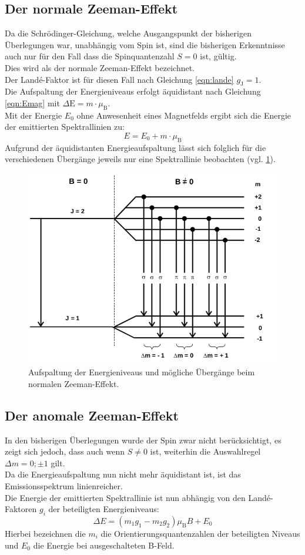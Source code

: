 \subsection{Der normale Zeeman-Effekt}
Da die Schrödinger-Gleichung, welche Ausgangspunkt der bisherigen Überlegungen war, unabhängig vom Spin ist, sind die bisherigen Erkenntnisse auch nur für den Fall dass die Spinquantenzahl $S=0$ ist, gültig.\\
Dies wird als der normale Zeeman-Effekt bezeichnet.\\ Der Landé-Faktor ist für diesen Fall nach Gleichung \eqref{eqn:lande} $g_{\mathrm{J}}=1$.\\
Die Aufspaltung der Energieniveaus erfolgt äquidistant nach Gleichung \eqref{eqn:Emag} mit $\Delta \mathrm{E}=m\cdot \mu_{\mathrm{B}}$.\\
Mit der Energie $E_0$ ohne Anwesenheit eines Magnetfelds ergibt sich die Energie der emittierten Spektrallinien zu:
\begin{equation}
  E=E_0+ m\cdot \mu_{\mathrm{B}}
\end{equation}
Aufgrund der äquidistanten Energieaufspaltung lässt sich folglich für die verschiedenen Übergänge jeweils nur eine Spektrallinie beobachten (vgl. \ref{fig:normaler}).
\begin{figure}
  \centering
  \includegraphics[width=0.75\columnwidth]{pictures/linienaufspaltung.png}
  \caption{Aufspaltung der Energieniveaus und mögliche Übergänge beim normalen Zeeman-Effekt.\cite{Anleitung}}
  \label{fig:normaler}
\end{figure}
\subsection{Der anomale Zeeman-Effekt}
In den bisherigen Überlegungen wurde der Spin zwar nicht berücksichtigt, es zeigt sich jedoch, dass auch wenn $S\neq 0$ ist, weiterhin die Auswahlregel $\Delta m=0 ; \pm 1$ gilt.\\
Da die Energieaufspaltung nun nicht mehr äquidistant ist, ist das Emissionsspektrum linienreicher.\\
Die Energie der emittierten Spektrallinie ist nun abhängig von den Landé-Faktoren $g_i$ der beteiligten Energieniveaus:
\begin{equation}
  \Delta E=\left(m_1g_1-m_2g_2\right)\mu_{\mathrm{B}}B+E_0
\end{equation}
Hierbei bezeichnen die $m_i$ die Orientierungsquantenzahlen der beteiligten Niveaus und $E_0$ die Energie bei ausgeschalteten B-Feld.

